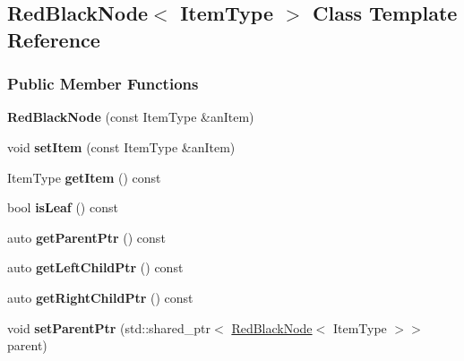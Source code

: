 \hypertarget{class_red_black_node}{}\subsection{Red\+Black\+Node$<$ Item\+Type $>$ Class Template Reference}
\label{class_red_black_node}
\subsubsection*{Public Member Functions}
\begin{DoxyCompactItemize}
\item 
{\bfseries Red\+Black\+Node} (const Item\+Type \&an\+Item)\hypertarget{class_red_black_node_a0084ccc077201a1b1ed2882547e37346}{}\label{class_red_black_node_a0084ccc077201a1b1ed2882547e37346}

\item 
void {\bfseries set\+Item} (const Item\+Type \&an\+Item)\hypertarget{class_red_black_node_a2d85b7fa492d30107bee1847b18cea09}{}\label{class_red_black_node_a2d85b7fa492d30107bee1847b18cea09}

\item 
Item\+Type {\bfseries get\+Item} () const \hypertarget{class_red_black_node_a3e03fbea096165d70b4ecfeb4081bb8b}{}\label{class_red_black_node_a3e03fbea096165d70b4ecfeb4081bb8b}

\item 
bool {\bfseries is\+Leaf} () const \hypertarget{class_red_black_node_a1988a483fdbacea1c1feb308486969c6}{}\label{class_red_black_node_a1988a483fdbacea1c1feb308486969c6}

\item 
auto {\bfseries get\+Parent\+Ptr} () const \hypertarget{class_red_black_node_ab0bf558ba04dbc9fe34c67e95f94806f}{}\label{class_red_black_node_ab0bf558ba04dbc9fe34c67e95f94806f}

\item 
auto {\bfseries get\+Left\+Child\+Ptr} () const \hypertarget{class_red_black_node_aa3b856ade06f63a9f250e7e05d3d9efa}{}\label{class_red_black_node_aa3b856ade06f63a9f250e7e05d3d9efa}

\item 
auto {\bfseries get\+Right\+Child\+Ptr} () const \hypertarget{class_red_black_node_af844d3a70bd642cffaa23e26e07796f8}{}\label{class_red_black_node_af844d3a70bd642cffaa23e26e07796f8}

\item 
void {\bfseries set\+Parent\+Ptr} (std\+::shared\+\_\+ptr$<$ \hyperlink{class_red_black_node}{Red\+Black\+Node}$<$ Item\+Type $>$$>$ parent)\hypertarget{class_red_black_node_ae07d76d70f1c582483f8ede44f6c8038}{}\label{class_red_black_node_ae07d76d70f1c582483f8ede44f6c8038}


\end{DoxyCompactItemize}
